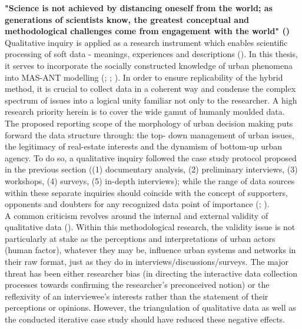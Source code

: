 \documentclass[11pt]{report}
\begin{document}
\textbf{"Science is not achieved  by distancing oneself from  the world; as  generations of scientists  know,  the greatest conceptual and methodological challenges come from  engagement with the world" (\href{Whyte}{\citealt{whyte_participatory_1991}})}
\\

Qualitative inquiry is applied as a research instrument which enables scientific processing of soft data - meanings, experiences and descriptions (\href{Yin}{\citealt{yin_case_2003}}).
In this thesis, it serves to incorporate the socially constructed knowledge of urban phenomena into MAS-ANT modelling (\href{Mertens}{\citealt{mertens_introduction_1998}}; \href{Flick}{\citealt{flick_introduction_2009}}; \href{Grubovic}{\citealt{grubovic_belgrade_2006}}).
In order to ensure replicability of the hybrid method, it is crucial to collect data in a coherent way and condense the complex spectrum of issues into a logical unity familiar not only to the researcher. A high research priority herein is to cover the wide gamut of humanly moulded data. The proposed reporting scope of the morphology of urban decision making puts forward the data structure through: the top- down management of urban issues, the legitimacy of real-estate interests and the dynamism of bottom-up urban agency. To do so, a qualitative inquiry followed the case study protocol proposed in the previous section ((1) documentary analysis, (2) preliminary interviews, (3) workshops, (4) surveys, (5) in-depth interviews); while the range of data sources within these separate inquiries should coincide with the concept of supporters, opponents and doubters for any recognized data point of importance (\href{Pettigrew}{\citealt{pettigrew_character_1992}}; \href{Harrison}{\citealt{partington_case_2002}}). 
\\

A common criticism revolves around the internal and external validity of qualitative data (\href{Flyvbjerg}{\citealt{flyvbjerg_five_2006}}). Within this methodological research, the validity issue is not particularly at stake as the perceptions and interpretations of urban actors (human factor), whatever they may be, influence urban systems and networks in their raw format, just as they do in interviews/discussions/surveys. The major threat has been either researcher bias (in directing the interactive data collection processes towards confirming the researcher’s preconceived notion) or the reflexivity of an interviewee’s interests rather than the statement of their perceptions or opinions. However, the triangulation of qualitative data as well as the conducted iterative case study should have reduced these negative effects.
\\
\end{document}
